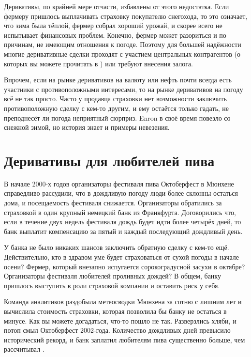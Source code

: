 Деривативы, по крайней мере отчасти, избавлены от этого недостатка. Если фермеру
пришлось выплачивать страховку покупателю снегохода, то это означает, что зима
была тёплой, фермер собрал хороший урожай, и скорее всего не испытывает финансовых
проблем. Конечно, фермер может разориться и по причинам, не имеющим отношения к
погоде. Поэтому для большей надёжности многие деривативные сделки проходят с
участием центральных контрагентов (о которых вы можете прочитать в )
или требуют внесения залога.

Впрочем, если на рынке деривативов на валюту или нефть почти всегда есть участники с
противоположными интересами, то на рынке деривативов на погоду всё не так просто.
Часто у продавца страховки нет возможности заключить противоположную сделку с кем-то другим,
и ему остаётся только гадать, не преподнесёт ли погода неприятный сюрприз. Enron
в своё время повезло со снежной зимой, но история знает и примеры невезения.

\section*{Деривативы для любителей пива}

В начале 2000-х годов организаторы фестиваля пива Октоберфест в Мюнхене справедливо
рассудили, что в дождливую погоду люди более склонны остаться дома, и посещаемость
фестиваля снижается. Организаторы обратились за страховкой в один крупный немецкий банк из Франкфурта. Договорились что, если в течение двух недель
фестиваля дождь будет идти более четырёх дней, то банк выплатит компенсацию за пятый
и каждый последующий дождливый день.
 
У банка не было никаких шансов заключить обратную сделку с кем-то ещё.
Действительно, кто в здравом уме будет страховаться от сухой погоды в начале
осени? Фермер, который внезапно испугается сорокоградусной засухи в октябре?
Организаторы фестиваля любителей проливных дождей? В общем, банку пришлось
выступить в роли страховой компании и оставить риск у себя.

Команда аналитиков раздобыла метеосводки Мюнхена за сотню с лишним лет и
вычислила стоимость страховки, которая позволила бы банку не остаться в минусе.
Как вы можете догадаться, что-то пошло не так. Разверзлись хляби, и потоп смыл
Октоберфест 2002-года. Количество дождливых дней превысило исторический рекорд,
и банк заплатил любителям пива существенно больше, чем рассчитывал \cite[p.~160]{rodgers2016why}.

